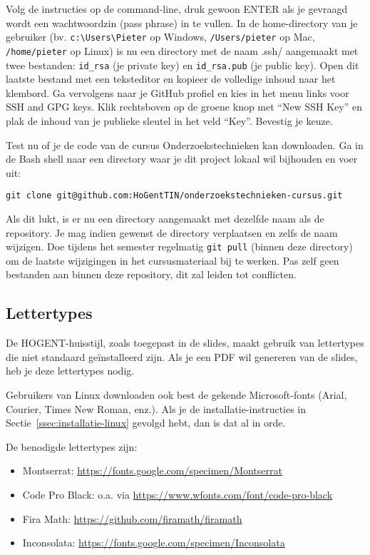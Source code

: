 Volg de instructies op de command-line, druk gewoon ENTER als je gevraagd wordt een wachtwoordzin (pass phrase) in te vullen. In de home-directory van je gebruiker (bv. \verb|c:\Users\Pieter| op Windows, \verb|/Users/pieter| op Mac, \verb|/home/pieter| op Linux) is nu een directory met de naam .ssh/ aangemaakt met twee bestanden: \verb|id_rsa| (je private key) en \verb|id_rsa.pub| (je public key). Open dit laatste bestand met een teksteditor en kopieer de volledige inhoud naar het klembord. Ga vervolgens naar je GitHub profiel en kies in het menu links voor SSH and GPG keys. Klik rechtsboven op de groene knop met ``New SSH Key'' en plak de inhoud van je publieke sleutel in het veld ``Key''. Bevestig je keuze.

Test nu of je de code van de cursus Onderzoekstechnieken kan downloaden. Ga in de Bash shell naar een directory waar je dit project lokaal wil bijhouden en voer uit:

\begin{verbatim}
git clone git@github.com:HoGentTIN/onderzoekstechnieken-cursus.git
\end{verbatim}

Als dit lukt, is er nu een directory aangemaakt met dezelfde naam als de repository. Je mag indien gewenst de directory verplaatsen en zelfs de naam wijzigen. Doe tijdens het semester regelmatig \texttt{git pull} (binnen deze directory) om de laatste wijzigingen in het cursusmateriaal bij te werken. Pas zelf geen bestanden aan binnen deze repository, dit zal leiden tot conflicten.

\subsection{Lettertypes}

De HOGENT-huisstijl, zoals toegepast in de slides, maakt gebruik van lettertypes die niet standaard geïnstalleerd zijn. Als je een PDF wil genereren van de slides, heb je deze lettertypes nodig.

Gebruikers van Linux downloaden ook best de gekende Microsoft-fonts (Arial, Courier, Times New Roman, enz.). Als je de installatie-instructies in Sectie~\ref{ssec:installatie-linux} gevolgd hebt, dan is dat al in orde.

De benodigde lettertypes zijn:

\begin{itemize}
  \item Montserrat: \url{https://fonts.google.com/specimen/Montserrat}
  \item Code Pro Black: o.a. via \url{https://www.wfonts.com/font/code-pro-black}
  \item Fira Math: \url{https://github.com/firamath/firamath}
  \item Inconsolata: \url{https://fonts.google.com/specimen/Inconsolata}
\end{itemize}

